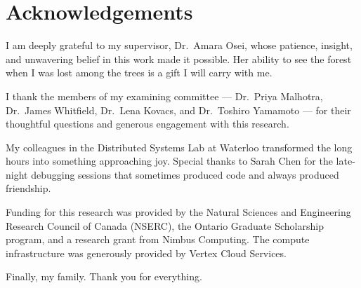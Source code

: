\chapter*{Acknowledgements}

I am deeply grateful to my supervisor, Dr.~Amara Osei, whose patience, insight, and unwavering belief in this work made it possible. Her ability to see the forest when I was lost among the trees is a gift I will carry with me.

I thank the members of my examining committee --- Dr.~Priya Malhotra, Dr.~James Whitfield, Dr.~Lena Kovacs, and Dr.~Toshiro Yamamoto --- for their thoughtful questions and generous engagement with this research.

My colleagues in the Distributed Systems Lab at Waterloo transformed the long hours into something approaching joy. Special thanks to Sarah Chen for the late-night debugging sessions that sometimes produced code and always produced friendship.

Funding for this research was provided by the Natural Sciences and Engineering Research Council of Canada (NSERC), the Ontario Graduate Scholarship program, and a research grant from Nimbus Computing. The compute infrastructure was generously provided by Vertex Cloud Services.

Finally, my family. Thank you for everything.

\newpage

\tableofcontents
\newpage
\listoffigures
\newpage
\listoftables
\newpage

